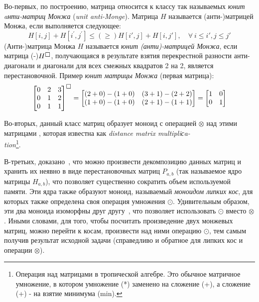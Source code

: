 Во-первых, по построению, матрица относится к классу так называемых  \emph{юнит aнти-матриц Монжа} (\emph{unit anti-Monge}).
Матрица $H$ называется (анти-)матрицей Монжа, если выполняется следующее:
\begin{equation}
    H[i, j] + H[i^{'},j^{'}] \leq(\geq) H[i', j] + H[i,j'] ,\quad \forall \: i \leq i' , j \leq j'
\end{equation}
(Анти-)матрица Монжа $H$ называется \emph{юнит (анти)-матрицей Монжа}, если матрица (-)$H^{\msquare}$, получающаяся в результате взятия перекрестной разности анти-диагонали и диагонали для всех смежных квадратов 2 на 2,   является перестановочной. Пример \emph{юнит матрицы Монжа} (первая матрица):
\begin{equation}
\begin{bmatrix}
0 & 2 & 3 \\
0 & 1 & 2 \\
0 & 1 & 1
\end{bmatrix} ^ { \msquare} =
\begin{bmatrix}
(2 + 0) - (1 + 0)  & (3 + 1) - (2 + 2)  \\
(1 + 0) - (1 + 0) &  (2 + 1) - (1 + 1) 
\end{bmatrix} = 
\begin{bmatrix}
1 & 0  \\
0 & 1 
\end{bmatrix} 
\end{equation}


Во-вторых, данный класс матриц образует моноид с операцией $\otimes$ над этими матрицами , которая известна как \emph{distance matrix multipliсa-\\tion}\footnote{Операция над матрицами в тропической алгебре. Это обычное матричное умножение, в котором умножение (*) заменено на сложение (+), а сложение (+) - на взятие минимума (min).}.

В-третьих, доказано~\cite{tiskin2006all}, что можно произвести декомпозицию данных матриц и хранить их неявно в виде перестановочных матриц  $P_{a,b}$ (так называемое ядро матрицы $H_{a,b}$), что позволяет существенно сократить объем используемой памяти.
Эти ядра также образуют моноид, называемый \emph{моноидом липких кос}, для которых также определена своя операция умножения $\odot$.
Удивительным образом, эти два моноида изоморфны друг другу~\cite{tiskin2006all}, что позволяет использовать $\odot$ вместо $\otimes$. 
Иными словами, для того, чтобы посчитать произведение двух монжевых матриц, можно перейти к косам, произвести над ними операцию $\odot$, тем самым получив результат исходной задачи (справедливо и обратное для липких кос и операции $\otimes$).
    
